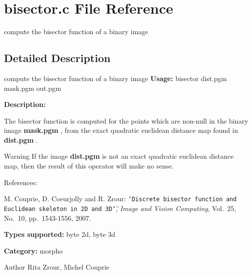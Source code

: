 \section{bisector.c File Reference}
\label{bisector_8c}


compute the bisector function of a binary image  




\subsection{Detailed Description}
compute the bisector function of a binary image {\bfseries Usage:} bisector dist.pgm mask.pgm out.pgm

{\bfseries Description:}

The bisector function is computed for the points which are non-\/null in the binary image {\bfseries mask.pgm} , from the exact quadratic euclidean distance map found in {\bfseries dist.pgm} .

\begin{DoxyWarning}{Warning}
If the image {\bfseries dist.pgm} is not an exact quadratic euclidean distance map, then the result of this operator will make no sense.
\end{DoxyWarning}
References:\par
 [CCZ07] M. Couprie, D. Coeurjolly and R. Zrour: {\tt \char`\"{}Discrete bisector function and Euclidean skeleton in 2D and 3D\char`\"{}}, {\itshape Image and Vision Computing\/}, Vol.~25, No.~10, pp.~1543-\/1556, 2007.\par


{\bfseries Types supported:} byte 2d, byte 3d

{\bfseries Category:} morpho

\begin{DoxyAuthor}{Author}
Rita Zrour, Michel Couprie 
\end{DoxyAuthor}
